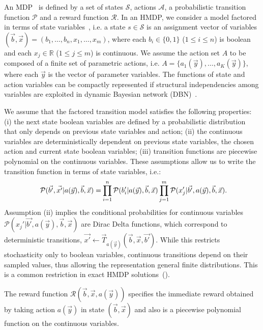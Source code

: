 An MDP~\cite{puterman94} is defined by a set of states $\mathcal{S}$, actions $\mathcal{A}$, a probabilistic transition function $\mathcal{P}$ and a reward function $\mathcal{R}$.
In an HMDP, we consider a model factored in terms of state variables~\cite{boutilier99}, i.e.
a state $s \in \mathcal{S}$ is an assignment vector of variables $(\vec{b},\vec{x}) = (b_1,\ldots,b_n,x_{1},\ldots,x_m )$, where each $b_i \in \{ 0,1 \}$ ($1 \leq i \leq n$) is boolean$\,$ and each $x_j \in \mathbb{R}$ ($1 \leq j \leq m$) is continuous.
We assume the action set $A$ to be composed of a finite set of parametric actions, i.e. $ A = \{ a_1(\vec{y}), \ldots, a_K(\vec{y})\}$, where each $\vec{y}$ is the vector of parameter variables.
The functions of state and action variables can be compactly represented if structural independencies among variables are exploited in dynamic Bayesian network (DBN)~\cite{dean90DBN}. 

We assume that the factored transition model satisfies the following properties: (i) the next state boolean variables are defined by a probabilistic distribution that only depends on previous state variables and action; (ii) the continuous variables are deterministically dependent on previous state variables, the chosen action and current state boolean variables; (iii) transition functions are piecewise polynomial on the continuous variables. 
These assumptions allow us to write the transition function in terms of state variables, i.e.:
\begin{equation}
\small
\hspace{-0.6mm} \mathcal{P}(\vec{b'},\vec{x'} | a(\vec{y}),\vec{b},\vec{x}) =\hspace{-0.2mm} \prod_{i=1}^{n} \mathcal{P}(b_i' | a(\vec{y}),\vec{b},\vec{x}) \prod_{j=1}^{m} \mathcal{P}(x_j' | \vec{b'}, a(\vec{y}),\vec{b},\vec{x}).\hspace{-2mm}
\end{equation}
Assumption (ii) implies the conditional probabilities for continuous variables $\mathcal{P}(x_j' | \vec{b'}, a(\vec{y}),\vec{b},\vec{x})$ are Dirac Delta functions, which correspond to deterministic transitions, $\vec{x'} \gets \vec{T}_{a(\vec{y})}(\vec{b},\vec{x},\vec{b'})$.
While this restricts stochasticity only to boolean variables, continuous transitions depend on their sampled values, thus allowing the representation general finite distributions.
This is a common restriction in exact HMDP solutions~(\cite{feng04,meuleau09HAO,sanner11}).

The reward function $\mathcal{R}(\vec{b},\vec{x},a(\vec{y}))$ specifies the immediate reward obtained by taking action $a(\vec{y})$ in state $(\vec{b},\vec{x})$ and also is a piecewise polynomial function on the continuous variables.

